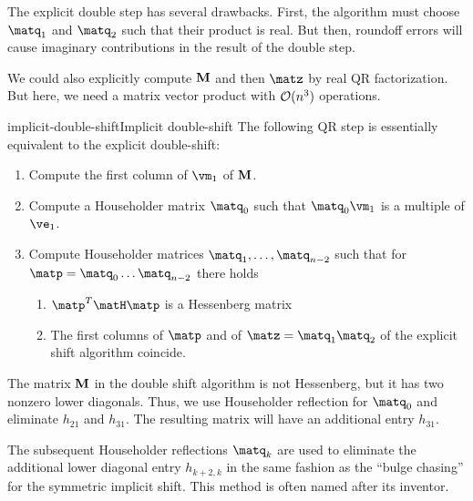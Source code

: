 \begin{remark}
  The explicit double step has several drawbacks. First, the algorithm
  must choose $\matq_1$ and $\matq_2$ such that their product is
  real. But then, roundoff errors will cause imaginary contributions
  in the result of the double step.

  We could also explicitly compute $\mathbf M$ and then $\matz$ by real QR
  factorization. But here, we need a matrix vector product with
  $\mathcal O(n^3)$ operations.
\end{remark}

\begin{Theorem}{implicit-double-shift}{Implicit double-shift}
  The following QR step is essentially equivalent to the explicit double-shift:
  \begin{enumerate}
  \item Compute the first column of $\vm_1$ of $\mathbf M$.
  \item Compute a Householder matrix $\matq_0$ such that $\matq_0\vm_1$ is a multiple of $\ve_1$.
  \item Compute Householder matrices $\matq_1,\dots,\matq_{n-2}$ such
    that for $\matp = \matq_0\dots\matq_{n-2}$ there holds
    \begin{enumerate}
    \item $\matp^T\matH\matp$ is a Hessenberg matrix
    \item The first columns of $\matp$ and of $\matz = \matq_1\matq_2$
      of the explicit shift algorithm coincide.
    \end{enumerate}
  \end{enumerate}
\end{Theorem}

\begin{remark}
  The matrix $\mathbf M$ in the double shift algorithm is not Hessenberg,
  but it has two nonzero lower diagonals. Thus, we use Householder
  reflection for $\matq_0$ and eliminate $h_{21}$ and $h_{31}$. The
  resulting matrix will have an additional entry $h_{31}$.

  The subsequent Householder reflections $\matq_k$ are used to
  eliminate the additional lower diagonal entry $h_{k+2,k}$ in the
  same fashion as the ``bulge chasing'' for the symmetric implicit
  shift. This method is often named  after its
  inventor.
\end{remark}

